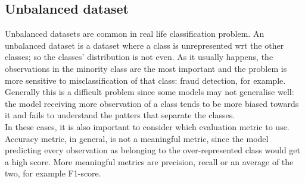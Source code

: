 \subsection{Unbalanced dataset}
\label{ssec:unbalan}
Unbalanced datasets are common in real life classification problem. An unbalanced dataset is a dataset where a class is unrepresented \gls{wrt} the other classes; so the classes' distribution is not even. As it usually happens, the observations in the minority class are the most important and the problem is more sensitive to misclassification of that class: fraud detection, for example.\\

Generally this is a difficult problem since some models may not generalise well: the model receiving more observation of a class tends to be more biased towards it and fails to understand the patters that separate the classes. \\
In these cases, it is also important to consider which evaluation metric to use. Accuracy metric, in general, is not a meaningful metric, since the model predicting every observation as belonging to the over-represented class would get a high score. More meaningful metrics are precision, recall or an average of the two, for example F1-score.\\

